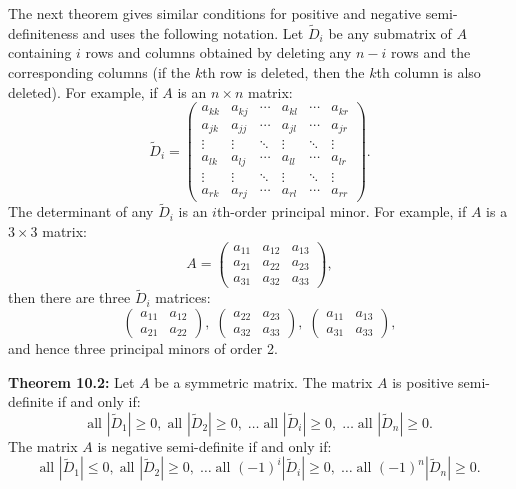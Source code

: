 \begin{original}
The next theorem gives similar conditions for positive and negative semi-definiteness and uses the following notation. Let $\tilde{D}_i$ be any submatrix of $A$ containing $i$ rows and columns obtained by deleting any $n-i$ rows and the corresponding columns (if the $k$th row is deleted, then the $k$th column is also deleted). For example, if $A$ is an $n \times n$ matrix:
\[
\tilde{D}_i =
\begin{pmatrix}
a_{kk} & a_{kj} & \cdots & a_{kl} & \cdots & a_{kr} \\
a_{jk} & a_{jj} & \cdots & a_{jl} & \cdots & a_{jr} \\
\vdots & \vdots & \ddots & \vdots & \ddots & \vdots \\
a_{lk} & a_{lj} & \cdots & a_{ll} & \cdots & a_{lr} \\
\vdots & \vdots & \ddots & \vdots & \ddots & \vdots \\
a_{rk} & a_{rj} & \cdots & a_{rl} & \cdots & a_{rr}
\end{pmatrix}.
\]
The determinant of any $\tilde{D}_i$ is an $i$th-order principal minor.
For example, if $A$ is a $3 \times 3$ matrix:
\[
A = \begin{pmatrix} a_{11} & a_{12} & a_{13} \\ a_{21} & a_{22} & a_{23} \\ a_{31} & a_{32} & a_{33} \end{pmatrix},
\]
then there are three $\tilde{D}_i$ matrices:
\[
\begin{pmatrix} a_{11} & a_{12} \\ a_{21} & a_{22} \end{pmatrix},\;
\begin{pmatrix} a_{22} & a_{23} \\ a_{32} & a_{33} \end{pmatrix},\;
\begin{pmatrix} a_{11} & a_{13} \\ a_{31} & a_{33} \end{pmatrix},
\]
and hence three principal minors of order 2.

\textbf{Theorem 10.2:} Let $A$ be a symmetric matrix.
The matrix $A$ is positive semi-definite if and only if:
\[
\text{all } |\tilde{D}_1| \geq 0,\; \text{all } |\tilde{D}_2| \geq 0,\; \ldots\; \text{all } |\tilde{D}_i| \geq 0,\; \ldots\; \text{all } |\tilde{D}_n| \geq 0.
\]
The matrix $A$ is negative semi-definite if and only if:
\[
\text{all } |\tilde{D}_1| \leq 0,\; \text{all } |\tilde{D}_2| \geq 0,\; \ldots\; \text{all } (-1)^i|\tilde{D}_i| \geq 0,\; \ldots\; \text{all } (-1)^n|\tilde{D}_n| \geq 0.
\]


\end{original}
